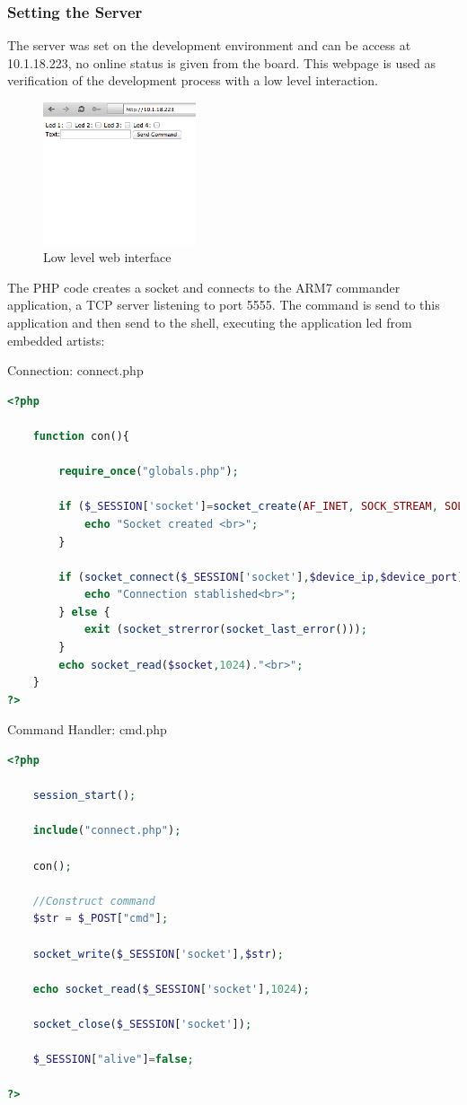 \subsubsection{Setting the Server}
The server was set on the development environment and can be access at 10.1.18.223, no online status is given from the board. This webpage is used as verification of the development process with a low level interaction. 
\begin{figure}[H]
	\begin{centering}
		 \includegraphics[width=0.4\textwidth,page=1]{content/appendix/eudp/images/website.png}
		\caption{Low level web interface}
	\end{centering}
\end{figure}

The PHP code creates a socket and connects to the ARM7 commander application, a TCP server listening to port 5555. The command is send to this application and then send to the shell, executing the application led from embedded artists:

Connection: connect.php
\\
\begin{lstlisting}[language=php]
<?php
	
	function con(){
	
		require_once("globals.php");
		
		if ($_SESSION['socket']=socket_create(AF_INET, SOCK_STREAM, SOL_TCP)){
			echo "Socket created <br>";
		}
	
		if (socket_connect($_SESSION['socket'],$device_ip,$device_port)){
			echo "Connection stablished<br>";	
		} else {
			exit (socket_strerror(socket_last_error()));
		}
		echo socket_read($socket,1024)."<br>";	
	}    
?>
\end{lstlisting}

Command Handler: cmd.php

\begin{lstlisting}[language=php]
<?php
	
	session_start();
	
	include("connect.php");
	
	con();
		
	//Construct command
	$str = $_POST["cmd"];
	
	socket_write($_SESSION['socket'],$str);
	
	echo socket_read($_SESSION['socket'],1024);
	
	socket_close($_SESSION['socket']);
	
	$_SESSION["alive"]=false;

?>
\end{lstlisting}

